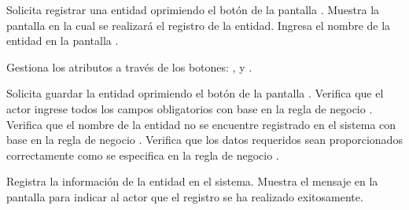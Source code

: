  \begin{UCtrayectoria}
    \UCpaso[\UCactor] Solicita registrar una entidad oprimiendo el botón  de la pantalla .
    \UCpaso[\UCsist] Muestra la pantalla  en la cual se realizará el registro de la entidad. 
    \UCpaso[\UCactor] Ingresa el nombre de la entidad en la pantalla . \label{cu11.1:ingresaDatos}
    
    \UCpaso[\UCactor] Gestiona los atributos a través de los botones: , \btnEditar y \btnEliminar. \label{cu11.1:gestionar}
    
    \UCpaso[\UCactor] Solicita guardar la entidad oprimiendo el botón  de la pantalla . 
    \UCpaso[\UCsist] Verifica que el actor ingrese todos los campos obligatorios con base en la regla de negocio  . 
    \UCpaso[\UCsist] Verifica que el nombre de la entidad no se encuentre registrado en el sistema con base en la regla de negocio  . 
    \UCpaso[\UCsist] Verifica que los datos requeridos sean proporcionados correctamente como se especifica en la regla de negocio . 

    \UCpaso[\UCsist] Registra la información de la entidad en el sistema.
    \UCpaso[\UCsist] Muestra el mensaje  en la pantalla  
    para indicar al actor que el registro se ha realizado exitosamente.
 \end{UCtrayectoria}
 
